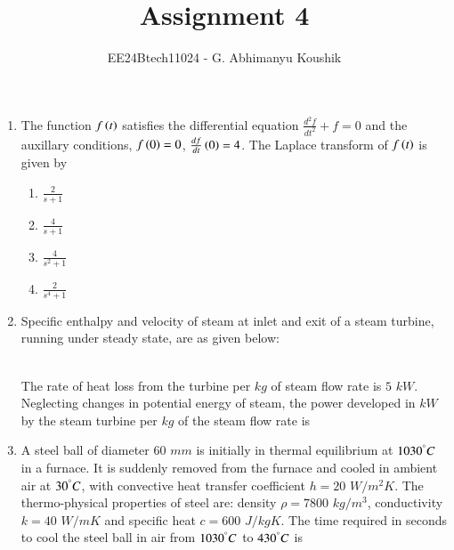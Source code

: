\documentclass[journal,12pt,onecolumn]{IEEEtran}
\theoremstyle{remark}
\begin{document}
\title{Assignment 4}
\author{EE24Btech11024 - G. Abhimanyu Koushik}
\maketitle
\renewcommand{\thefigure}{\theenumi}
\renewcommand{\thetable}{\theenumi}
\begin{enumerate}

\item The function $f\left(t\right)$ satisfies the differential equation $\frac{d^2f}{dt^2}+f=0$ and the auxillary conditions, $f\left(0\right)=0$, $\frac{df}{dt}\left(0\right)=4$. The Laplace transform of $f\left(t\right)$ is given by

\hfill{}
\begin{multicols}{4}
\begin{enumerate}
\item $\frac{2}{s+1}$
\item $\frac{4}{s+1}$
\item $\frac{4}{s^2+1}$
\item $\frac{2}{s^4+1}$
\end{enumerate}
\end{multicols}

\item Specific enthalpy and velocity of steam at inlet and exit of a steam turbine, running under steady state, are as given below:
\\\begin{table}[h!]    
  \centering
    \resizebox{0.7\textwidth}{!}{}
\end{table}\\
The rate of heat loss from the turbine per $kg$ of steam flow rate is $5$ $kW$. Neglecting changes in potential energy of steam, the power developed in $kW$ by the steam turbine per $kg$ of the steam flow rate is

\hfill{}
\begin{enumerate}
\end{enumerate}

\item A steel ball of diameter $60$ $mm$ is initially in thermal equilibrium at $1030^\degree C$ in a furnace. It is suddenly removed from the furnace and cooled in ambient air at $30^\degree C$, with convective heat transfer coefficient $h=20$ $W/m^2K$. The thermo-physical properties of steel are: density $\rho=7800$ $kg/m^3$, conductivity $k=40$ $W/mK$ and specific heat $c=600$ $J/kgK$. The time required in seconds to cool the steel ball in air from $1030^\degree C$ to $430^\degree C$ is


\end{enumerate}
\end{document}
